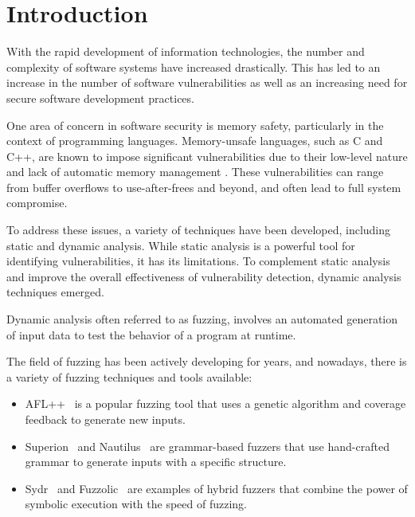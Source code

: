 \documentclass[conference]{IEEEtran}
\begin{document}
\IEEEpeerreviewmaketitle



\section{Introduction}
With the rapid development of information technologies, the number and complexity of software systems have increased drastically. This has led to an increase in the number of software vulnerabilities as well as an increasing need for secure software development practices.

One area of concern in software security is memory safety, particularly in the context of programming languages. Memory-unsafe languages, such as C and C++, are known to impose significant vulnerabilities due to their low-level nature and lack of automatic memory management \cite{chromium-project-memory-safety, android-project-memory-safety}. These vulnerabilities can range from buffer overflows to use-after-frees and beyond, and often lead to full system compromise.

To address these issues, a variety of techniques have been developed, including static and dynamic analysis. While static analysis is a powerful tool for identifying vulnerabilities, it has its limitations. To complement static analysis and improve the overall effectiveness of vulnerability detection, dynamic analysis techniques emerged.

Dynamic analysis often referred to as fuzzing, involves an automated generation of input data to test the behavior of a program at runtime.

The field of fuzzing has been actively developing for years, and nowadays, there is a variety of fuzzing techniques and tools available:

\begin{itemize}
    \item AFL++~\cite{AFLplusplus-Woot20} is a popular fuzzing tool that uses a genetic algorithm and coverage feedback to generate new inputs.
    \item Superion~\cite{superion-grammar-fuzzer} and Nautilus~\cite{nautilus-grammar-fuzzer} are grammar-based fuzzers that use hand-crafted grammar to generate inputs with a specific structure.
    \item Sydr~\cite{sydr-cutting-edge-dynamic-symbolic-execution} and Fuzzolic~\cite{fuzzolic-hybrid-fuzzer} are examples of hybrid fuzzers that combine the power of symbolic execution with the speed of fuzzing.
\end{itemize}
\end{document}

